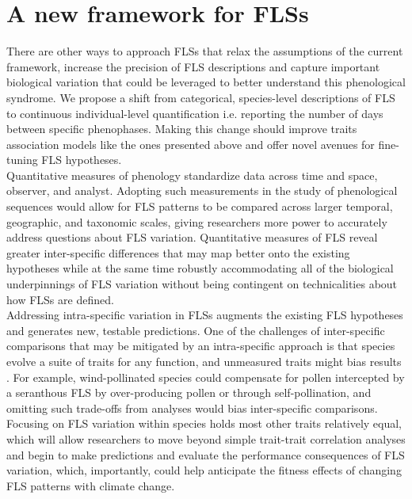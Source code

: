 \documentclass{article}
\begin{document}
\section*{A new framework for FLSs} %

\noindent There are other ways to approach FLSs that relax the assumptions of the current framework, increase the precision of FLS descriptions and capture important biological variation that could be leveraged to better understand this phenological syndrome. We propose a shift from categorical, species-level descriptions of FLS to continuous individual-level quantification i.e. reporting the number of days between specific phenophases. Making this change should improve traits association models like the ones presented above and offer novel avenues for fine-tuning FLS hypotheses.\\

\noindent Quantitative measures of phenology \citep[e.g. the BBCH scale,][]{Finn2007} standardize data across time and space, observer, and analyst. Adopting such measurements in the study of phenological sequences would allow for FLS patterns to be compared across larger temporal, geographic, and taxonomic scales, giving researchers more power to accurately address questions about FLS variation. Quantitative measures of FLS reveal greater inter-specific differences that may map better onto the existing hypotheses while at the same time robustly accommodating all of the biological underpinnings of FLS variation without being contingent on technicalities about how FLSs are defined.\\

\noindent Addressing intra-specific variation in FLSs augments the existing FLS hypotheses and generates new, testable predictions. One of the challenges of inter-specific comparisons that may be mitigated by an intra-specific approach is that species evolve a suite of traits for any function, and unmeasured traits might bias results \citep{Davies2019}. For example, wind-pollinated species could compensate for pollen intercepted by a seranthous FLS by over-producing pollen or through self-pollination, and omitting such trade-offs from analyses would bias inter-specific comparisons. Focusing on FLS variation within species holds most other traits relatively equal, which will allow researchers to move beyond simple trait-trait correlation analyses and begin to make predictions and evaluate the performance consequences of FLS variation, which, importantly, could help anticipate the fitness effects of changing FLS patterns with climate change. \\
\end{document}
